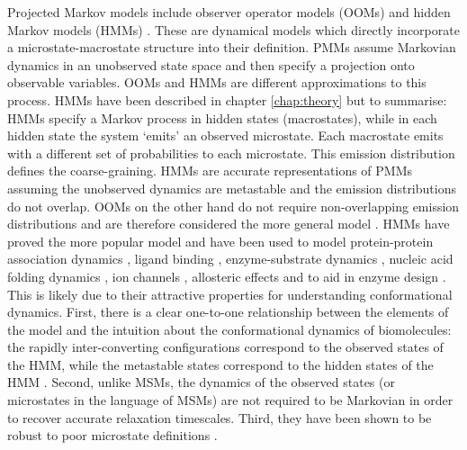 Projected Markov models include observer operator models (OOMs) \cite{wuProjectedMetastableMarkov2015} and hidden Markov models (HMMs) \cite{noeProjectedHiddenMarkov2013a}. These are dynamical models which directly incorporate a microstate-macrostate structure into their definition.  PMMs assume Markovian dynamics in an unobserved state space and then specify a projection onto observable variables. OOMs and HMMs are different approximations to this process.  HMMs have been described in chapter \ref{chap:theory} but to summarise: HMMs specify a Markov process in hidden states (macrostates), while in each hidden state the system `emits' an observed microstate.  Each macrostate emits with a different set of probabilities to each microstate. This emission distribution defines the coarse-graining.  HMMs are accurate representations of PMMs assuming the unobserved dynamics are metastable and the emission distributions do not overlap.  OOMs on the other hand do not require non-overlapping emission distributions and are therefore considered the more general model \cite{wuProjectedMetastableMarkov2015}. HMMs have proved the more popular model and have been used to model protein-protein association dynamics \cite{plattnerCompleteProteinProtein2017}, ligand binding \cite{mondalAtomicResolutionMechanism2018a, yangMappingPathwayDynamics2018, ahalawatMappingSubstrateRecognition2018, olaposiMembraneBoundTranscriptionFactor2019, hansonWhatMakesKinase2019}, enzyme-substrate dynamics \cite{panConformationalHeterogeneityMichaelis2016, wangDynamicalBehaviorVLactamases2019, curado-carballadaHiddenConformationsAspergillus2019}, nucleic acid folding dynamics \cite{FastFoldingPathwaysThrombinBinding2018, remingtonFluorescenceQuenching2aminopurinelabeled2019}, ion channels \cite{furiniIontriggeredSelectivityBacterial2018}, allosteric effects \cite{xiaoNaBindingModes2019} and to aid in enzyme design \cite{juarez-jimenezDynamicDesignManipulation2020}. This is likely due to their attractive properties for understanding conformational dynamics.  First, there is a clear one-to-one relationship between the elements of the model and the intuition about the conformational dynamics of biomolecules: the rapidly inter-converting configurations correspond to the observed states of the HMM, while the metastable states correspond to the hidden states of the HMM \cite{noeProjectedHiddenMarkov2013a}. Second, unlike MSMs, the dynamics of the observed states (or microstates in the language of MSMs) are not required to be Markovian in order to recover accurate relaxation timescales. Third, they have been shown to be robust to poor microstate definitions \cite{noeProjectedHiddenMarkov2013a}. 

